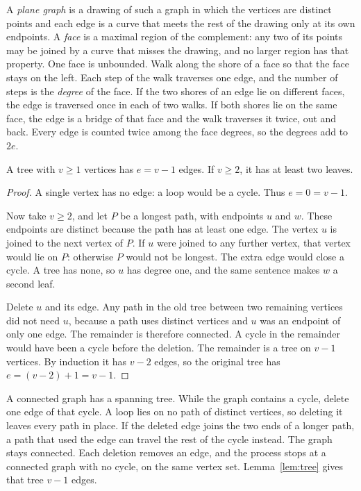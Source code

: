 A \emph{plane graph} is a drawing of such a graph in which the vertices are distinct points and each edge is a curve that meets the rest of the drawing only at its own endpoints. A \emph{face} is a maximal region of the complement: any two of its points may be joined by a curve that misses the drawing, and no larger region has that property. One face is unbounded. Walk along the shore of a face so that the face stays on the left. Each step of the walk traverses one edge, and the number of steps is the \emph{degree} of the face. If the two shores of an edge lie on different faces, the edge is traversed once in each of two walks. If both shores lie on the same face, the edge is a bridge of that face and the walk traverses it twice, out and back. Every edge is counted twice among the face degrees, so the degrees add to $2e$.

\begin{lemmax}[trees]\label{lem:tree}
A tree with $v\ge1$ vertices has $e=v-1$ edges. If $v\ge2$, it has at least two leaves.
\end{lemmax}
\begin{proof}
A single vertex has no edge: a loop would be a cycle. Thus $e=0=v-1$.

Now take $v\ge2$, and let $P$ be a longest path, with endpoints $u$ and $w$. These endpoints are distinct because the path has at least one edge. The vertex $u$ is joined to the next vertex of $P$. If $u$ were joined to any further vertex, that vertex would lie on $P$: otherwise $P$ would not be longest. The extra edge would close a cycle. A tree has none, so $u$ has degree one, and the same sentence makes $w$ a second leaf.

Delete $u$ and its edge. Any path in the old tree between two remaining vertices did not need $u$, because a path uses distinct vertices and $u$ was an endpoint of only one edge. The remainder is therefore connected. A cycle in the remainder would have been a cycle before the deletion. The remainder is a tree on $v-1$ vertices. By induction it has $v-2$ edges, so the original tree has $e=(v-2)+1=v-1$.
\end{proof}

A connected graph has a spanning tree. While the graph contains a cycle, delete one edge of that cycle. A loop lies on no path of distinct vertices, so deleting it leaves every path in place. If the deleted edge joins the two ends of a longer path, a path that used the edge can travel the rest of the cycle instead. The graph stays connected. Each deletion removes an edge, and the process stops at a connected graph with no cycle, on the same vertex set. Lemma~\ref{lem:tree} gives that tree $v-1$ edges.


